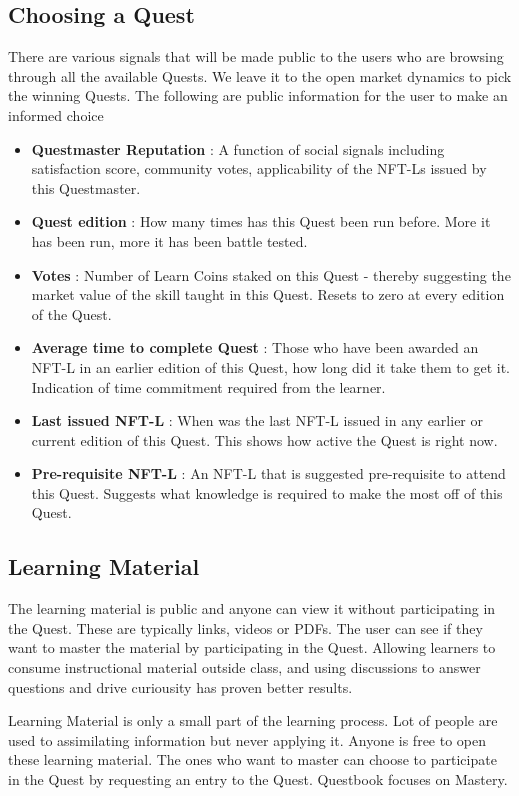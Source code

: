 \documentclass{article}
\begin{document}
    \subsection{Choosing a Quest}
        There are various signals that will be made public to the users who are browsing through all the available Quests. We leave it to the open market dynamics to pick the winning Quests.
        The following are public information for the user to make an informed choice
        \begin{itemize}
          \item \textbf{Questmaster Reputation }: A function of social signals including satisfaction score, community votes, applicability of the NFT-Ls issued by this Questmaster.
          \item \textbf{Quest edition }: How many times has this Quest been run before. More it has been run, more it has been battle tested.
          \item \textbf{Votes }: Number of Learn Coins staked on this Quest - thereby suggesting the market value of the skill taught in this Quest. Resets to zero at every edition of the Quest.
          \item \textbf{Average time to complete Quest }: Those who have been awarded an NFT-L in an earlier edition of this Quest, how long did it take them to get it. Indication of time commitment required from the learner. 
          \item \textbf{Last issued NFT-L }:  When was the last NFT-L issued in any earlier or current edition of this Quest. This shows how active the Quest is right now. 
          \item \textbf{Pre-requisite NFT-L }: An NFT-L that is suggested pre-requisite to attend this Quest. Suggests what knowledge is required to make the most off of this Quest.
        \end{itemize}
    \subsection{Learning Material}
        The learning material is public and anyone can view it without participating in the Quest. 
        These are typically links, videos or PDFs. The user can see if they want to master the material by participating in the Quest. 
        Allowing learners to consume instructional material outside class, and using discussions to answer questions and drive curiousity has proven better results. %
        \par
        Learning Material is only a small part of the learning process. Lot of people are used to assimilating information but never applying it. 
        Anyone is free to open these learning material. 
        The ones who want to master can choose to participate in the Quest by requesting an entry to the Quest.
        Questbook focuses on Mastery. %
\end{document}
